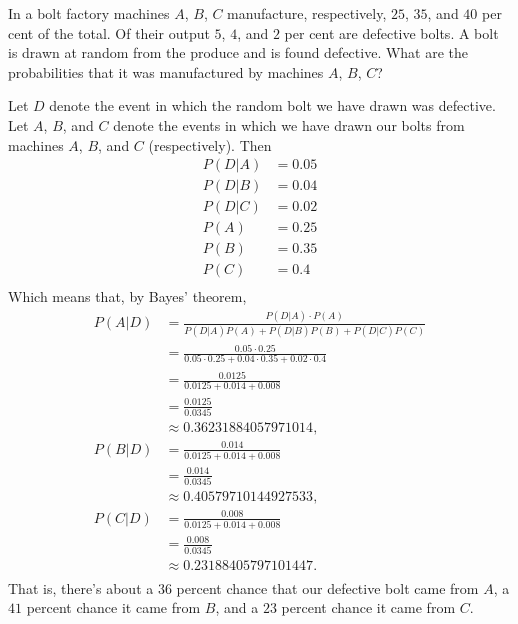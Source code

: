 \begin{problem}[Handout 4, \# 8]
  In a bolt factory machines \(A\), \(B\), \(C\) manufacture, respectively,
  \(25\), \(35\), and \(40\) per cent of the total. Of their output \(5\),
  \(4\), and \(2\) per cent are defective bolts. A bolt is drawn at random
  from the produce and is found defective. What are the probabilities that
  it was manufactured by machines \(A\), \(B\), \(C\)?
\end{problem}
\begin{solution}
  Let $D$ denote the event in which the random bolt we have drawn was
  defective. Let $A$, $B$, and $C$ denote the events in which we have drawn
  our bolts from machines $A$, $B$, and $C$ (respectively). Then
  \begin{align*}
    P(D|A) &=0.05 \\
    P(D|B) &=0.04 \\
    P(D|C) &=0.02 \\
    P(A)&=0.25 \\
    P(B)&=0.35 \\
    P(C)&=0.4 \\
  \end{align*}
  Which means that, by Bayes' theorem,
  \begin{align*}
    P(A|D) &=\frac{P(D|A)\cdot P(A)}{P(D|A)P(A)
                  +P(D|B)P(B)+P(D|C)P(C)} \\
                &=\frac{0.05 \cdot 0.25}{0.05 \cdot 0.25 + 0.04 \cdot 0.35 + 0.02 \cdot 0.4 } \\
                &= \frac{0.0125}{0.0125 + 0.014 + 0.008} \\
                &= \frac{0.0125}{0.0345} \\
                &\approx \num{0.36231884057971014}, \\
    P(B|D) &= \frac{0.014}{0.0125 + 0.014 + 0.008} \\
                &= \frac{0.014}{0.0345} \\
                &\approx \num{0.40579710144927533}, \\
    P(C|D) &= \frac{0.008}{0.0125 + 0.014 + 0.008} \\
                &= \frac{0.008}{0.0345} \\
                &\approx \num{0.23188405797101447}.\\
  \end{align*}
  That is, there's about a $36$ percent chance that our defective bolt came
  from $A$, a $41$ percent chance it came from $B$, and a $23$ percent
  chance it came from $C$.
\end{solution}
\newpage

